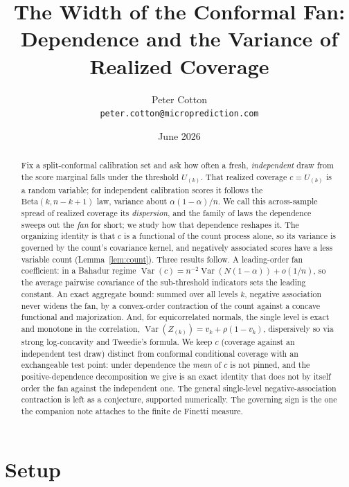 \documentclass[11pt]{article}
\title{The Width of the Conformal Fan:\\
Dependence and the Variance of Realized Coverage}
\author{Peter Cotton\\\texttt{peter.cotton@microprediction.com}}
\date{June 2026}
\begin{document}
\maketitle

\begin{abstract}
Fix a split-conformal calibration set and ask how often a fresh, \emph{independent} draw from the
score marginal falls under the threshold $U_{(k)}$. That realized coverage $c=U_{(k)}$ is a random
variable; for independent calibration scores it follows the $\mathrm{Beta}(k,n-k+1)$ law, variance
about $\alpha(1-\alpha)/n$. We call this across-sample spread of realized coverage its
\emph{dispersion}, and the family of laws the dependence sweeps out the \emph{fan} for short; we study
how that dependence reshapes it. The organizing identity is that $c$ is a functional of the count process
alone, so its variance is governed by the count's covariance kernel, and negatively associated scores
have a less variable count (Lemma~\ref{lem:count}). Three results follow. A leading-order fan
coefficient: in a Bahadur regime $\operatorname{Var}(c)=n^{-2}\operatorname{Var}(N(1-\alpha))+o(1/n)$,
so the average pairwise covariance of the sub-threshold indicators sets the leading constant. An exact
aggregate bound: summed over all levels $k$, negative association never widens the fan, by a
convex-order contraction of the count against a concave functional and majorization. And, for
equicorrelated normals, the single level is exact and monotone in the correlation,
$\operatorname{Var}(Z_{(k)})=v_k+\rho(1-v_k)$, dispersively so via strong log-concavity and Tweedie's
formula. We keep $c$ (coverage against an independent test draw) distinct from conformal conditional
coverage with an exchangeable test point: under dependence the \emph{mean} of $c$ is not pinned, and
the positive-dependence decomposition we give is an exact identity that does not by itself order the
fan against the independent one. The general single-level negative-association contraction is left as
a conjecture, supported numerically. The governing sign is the one the companion note attaches to the
finite de Finetti measure.
\end{abstract}

\section{Setup}
\end{document}
